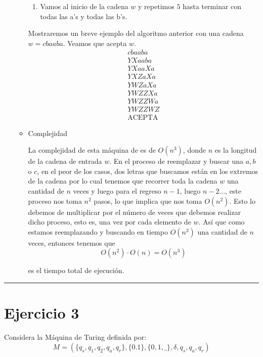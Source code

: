 \documentclass[12pt,letterpaper]{article}
\newcommand{\lineaxd}{{\color{brown}\rule{\linewidth}{0.5mm}}}
\begin{document}
\begin{enumerate}[a.]
\begin{itemize}
\begin{enumerate}[1.]
            \item Vamos al inicio de la cadena $w$ y repetimos $5$ hasta 
            terminar con todas las a's y todas las b's. 
        \end{enumerate}

        Mostraremos un breve ejemplo del algoritmo anterior con una cadena 
        $w = cbaaba$. Veamos que acepta $w$.  
        \begin{align*}
            cbaaba \\ 
            YXaaba \\ 
            YXaaXa \\ 
            YXZaXa \\ 
            YWZaXa \\ 
            YWZZXa \\ 
            YWZZWa \\ 
            YWZZWZ \\ 
            \text{ACEPTA}
        \end{align*}

        \item Complejidad 
        
        La complejidad de esta máquina de es de $O(n^3)$, donde $n$ es la 
        longitud de la cadena de entrada $w$. En el proceso de reemplazar y 
        buscar una $a, b$ o $c$, en el peor de los casos, dos letras que buscamos están en los extremos de la cadena por lo cual tenemos que recorrer 
        toda la cadena $w$ una cantidad de $n$ veces y luego para el regreso $n-1$, luego $n-2$..., este proceso nos toma $n^2$ pasos, lo que 
        implica que nos toma $O(n^2)$. Esto lo debemos de multiplicar por el 
        número de veces que debemos realizar dicho proceso, esto es, una vez 
        por cada elemento de $w$. Así que como estamos reemplazando y buscando 
        en tiempo $O(n^2)$ una cantidad de $n$ veces, entonces tenemos que 
        \begin{equation*}
            O(n^2) \cdot O(n) = O(n^3)
        \end{equation*} 

        es el tiempo total de ejecución. 
    \end{itemize}
\end{enumerate}

\lineaxd
\section*{Ejercicio 3}
Considera la Máquina de Turing definida por:
 $$M = (\{q_s, q_1, q_2, q_a, q_r\}, \{0.1\}, \{0,1, \_ \}, \delta, q_s, q_a, q_r)$$
 
\end{document}
